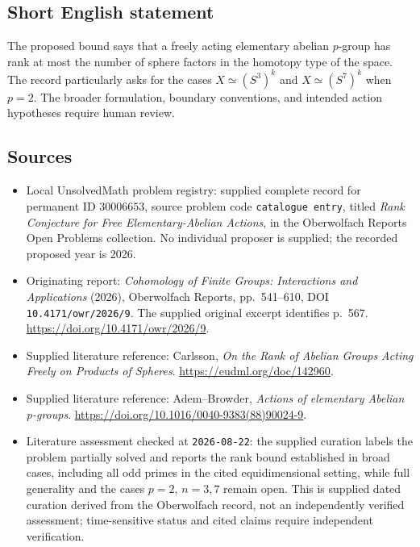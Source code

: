 \documentclass[11pt]{article}
\begin{document}
\subsection{Short English statement}
The proposed bound says that a freely acting elementary abelian \(p\)-group has rank at most the number of sphere factors in the homotopy type of the space. The record particularly asks for the cases \(X\simeq(S^3)^k\) and \(X\simeq(S^7)^k\) when \(p=2\). The broader formulation, boundary conventions, and intended action hypotheses require human review.
\subsection{Sources}
\begin{itemize}
\item Local UnsolvedMath problem registry: supplied complete record for permanent ID \(30006653\), source problem code \texttt{catalogue entry}, titled \emph{Rank Conjecture for Free Elementary-Abelian Actions}, in the Oberwolfach Reports Open Problems collection. No individual proposer is supplied; the recorded proposed year is 2026.
\item Originating report: \emph{Cohomology of Finite Groups: Interactions and Applications} (2026), Oberwolfach Reports, pp.~541--610, DOI \texttt{10.4171/owr/2026/9}. The supplied original excerpt identifies p.~567. \url{https://doi.org/10.4171/owr/2026/9}.
\item Supplied literature reference: Carlsson, \emph{On the Rank of Abelian Groups Acting Freely on Products of Spheres}. \url{https://eudml.org/doc/142960}.
\item Supplied literature reference: Adem--Browder, \emph{Actions of elementary Abelian p-groups}. \url{https://doi.org/10.1016/0040-9383(88)90024-9}.
\item Literature assessment checked at \texttt{2026-08-22}: the supplied curation labels the problem partially solved and reports the rank bound established in broad cases, including all odd primes in the cited equidimensional setting, while full generality and the cases \(p=2\), \(n=3,7\) remain open. This is supplied dated curation derived from the Oberwolfach record, not an independently verified assessment; time-sensitive status and cited claims require independent verification.
\end{itemize}
\end{document}
